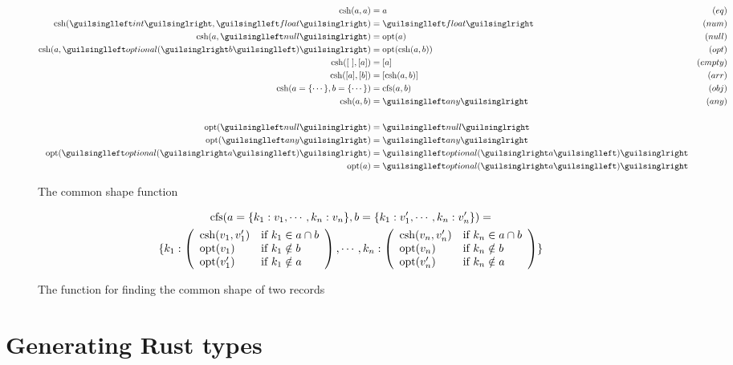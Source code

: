 \begin{figure}[ht!]
\begin{align*}
\csh(a, a)               &=  a               & (eq) \\
\csh(‹int›, ‹float›)     &= ‹float›          & (num) \\
\csh(a, ‹null›)          &= \opt(a)          & (null) \\
\csh(a, ‹optional(›b‹)›) &= \opt(\csh(a, b)) & (opt) \\
\csh([\ ], [a])          &= [a]              & (empty) \\
\csh([a], [b])           &= [\csh(a, b)]     & (arr) \\
\csh(a = \{ \cdots \}, b = \{ \cdots \}) &= \cfs(a, b) & (obj) \\
\csh(a, b)               &= ‹any›            & (any) \\
\\
\opt(‹null›) &= ‹null› \\
\opt(‹any›)  &= ‹any› \\
\opt(‹optional(›a‹)›) &= ‹optional(›a‹)› \\
\opt(a) &= ‹optional(›a‹)›
\end{align*}
\caption{The common shape function}
\label{fig:csh}
\end{figure}

\begin{figure}[ht!]
\begin{gather*}
\operatorname{cfs}(a = \{ k_1 : v_1, \cdots, k_n : v_n \}, b = \{ k_1 : v'_1, \cdots, k_n : v'_n \}) = \\
\{ k_1 : \left( \begin{array}{ll}
  \operatorname{csh}(v_1, v'_1) & \text{if } k_1 \in a \cap b \\
  \operatorname{opt}(v_1) & \text{if } k_1 \notin b \\
  \operatorname{opt}(v'_1) & \text{if } k_1 \notin a
\end{array}\right), \cdots, k_n : \left( \begin{array}{ll}
  \operatorname{csh}(v_n, v'_n) & \text{if } k_n \in a \cap b \\
  \operatorname{opt}(v_n) & \text{if } k_n \notin b \\
  \operatorname{opt}(v'_n) & \text{if } k_n \notin a
\end{array}\right) \}
\end{gather*}
\caption{The function for finding the common shape of two records}
\label{fig:ufi}
\end{figure}

\section{Generating Rust types}

